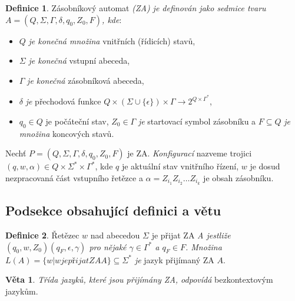 \documentclass[hidelinks, twocolumn, a4paper, 11pt]{article}
\theoremstyle{definition}
\newtheorem{theorem_def}{Definice}
\newtheorem{theorem_veta}{Věta}
\begin{document}
\begin{theorem_def}
    Zásobníkový automat \textsl{(ZA) je definován jako sedmice tvaru $A = (Q,\Sigma,\Gamma,\delta, q_0, Z_0, F)$, kde}:     
\end{theorem_def}

\begin{itemize}
    \item $Q$ \textsl{je konečná množina} vnitřních (řídicích) stavů, 
    \item $\Sigma$ \textsl{je konečná} vstupní abeceda, 
    \item $\Gamma$ \textsl{je konečná} zásobníková abeceda, 
    \item $\delta$ \textsl{je} přechodová funkce $Q \times (\Sigma \cup \{\epsilon\}) \times \Gamma \rightarrow 2^{Q\times\Gamma^\ast}$,
    \item $q_0 \in Q$ je počáteční stav, $Z_0 \in \Gamma$ \textsl{je} startovací symbol zásobníku a $F \subseteq Q$ \textsl{je množina} koncových stavů. 
\end{itemize}

Nechť $P = (Q,\Sigma,\Gamma,\delta, q_0, Z_0, F)$ je ZA. 
\textsl{Konfigurací} nazveme trojici $(q,w,\alpha) \in Q \times \Sigma^\ast \times \Gamma^\ast$, 
kde $q$ je aktuální stav vnitřního řízení, 
$w$ je dosud nezpracovaná část vstupního řetězce a
$\alpha = Z_{i_1}Z_{i_2}\dots Z_{i_k}$ je obsah zásobníku.

\subsection{Podsekce obsahující definici a větu}

\begin{theorem_def}
    Řetězec $w$ nad abecedou $\Sigma$ je přijat ZA \textsl{A jestliže $(q_0, w, Z_0) (q_F,\epsilon,\gamma)$ 
    pro nějaké $\gamma \in \Gamma^\ast$ a $q_F \in F$. 
    Množina $L(A) = \{ w | w je přijat ZA A \} \subseteq \Sigma^\ast$ je} jazyk přijímaný ZA $A$.
\end{theorem_def}

\begin{theorem_veta}
    \textsl{Třída jazyků, které jsou přijímány ZA, odpovídá} bezkontextovým jazykům.
\end{theorem_veta}
\end{document}
